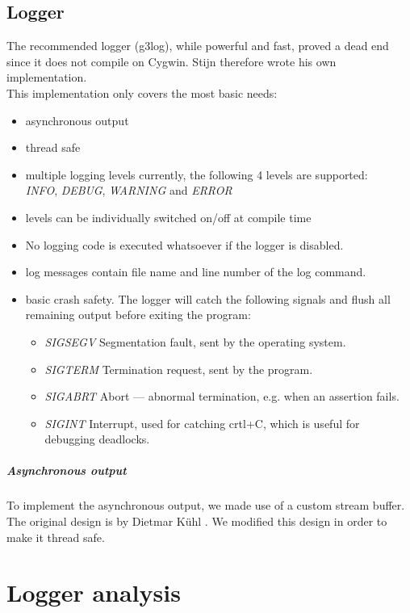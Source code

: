 \documentclass[8pt,a4paper]{report}
\begin{document}
\section{Logger}
The recommended logger (g3log), while powerful and fast, proved a dead end since it does not compile on Cygwin. 
Stijn therefore wrote his own implementation.\\
This implementation only covers the most basic needs:
\begin{itemize}
	\item asynchronous output
	\item thread safe
	\item multiple logging levels currently, the following 4 levels are supported:\\
		\emph{INFO}, \emph{DEBUG}, \emph{WARNING} and \emph{ERROR}
	\item levels can be individually switched on/off at compile time
	\item No logging code is executed whatsoever if the logger is disabled.
	\item log messages contain file name and line number of the log command.
	\item basic crash safety. The logger will catch the following signals and flush all remaining output before exiting the program:
		\begin{itemize}
			\item \emph{SIGSEGV} Segmentation fault, sent by the operating system.
			\item \emph{SIGTERM} Termination request, sent by the program.
			\item \emph{SIGABRT} Abort --- abnormal termination, e.g. when an assertion fails.
			\item \emph{SIGINT} Interrupt, used for catching crtl+C, which is useful for debugging deadlocks.
		\end{itemize}
\end{itemize}

\paragraph{Asynchronous output}
To implement the asynchronous output, we made use of a custom stream buffer. The original design is by Dietmar K{\"u}hl \cite{asynchwrite}. We modified this design in order to make it thread safe.

\chapter{Logger analysis}
\end{document}
